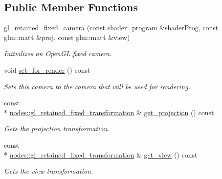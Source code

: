 \subsection*{Public Member Functions}
\begin{DoxyCompactItemize}
\item 
\hyperlink{classoccluded_1_1opengl_1_1retained_1_1scene_1_1objects_1_1gl__retained__fixed__camera_a11d41eb793d0b0ab72d81303f2a0422a}{gl\+\_\+retained\+\_\+fixed\+\_\+camera} (const \hyperlink{classoccluded_1_1opengl_1_1retained_1_1shaders_1_1shader__program}{shader\+\_\+program} \&shader\+Prog, const glm\+::mat4 \&proj, const glm\+::mat4 \&view)
\begin{DoxyCompactList}\small\item\em Initializes an Open\+G\+L fixed camera. \end{DoxyCompactList}\item 
void \hyperlink{classoccluded_1_1opengl_1_1retained_1_1scene_1_1objects_1_1gl__retained__fixed__camera_a81ea1cd723428ac234ca814c43363a90}{set\+\_\+for\+\_\+render} () const 
\begin{DoxyCompactList}\small\item\em Sets this camera to the camera that will be used for rendering. \end{DoxyCompactList}\item 
const \\*
\hyperlink{classoccluded_1_1opengl_1_1retained_1_1scene_1_1nodes_1_1gl__retained__fixed__transformation}{nodes\+::gl\+\_\+retained\+\_\+fixed\+\_\+transformation} \& \hyperlink{classoccluded_1_1opengl_1_1retained_1_1scene_1_1objects_1_1gl__retained__fixed__camera_a167066c59a31c58a34bf8112e3f9ef37}{get\+\_\+projection} () const 
\begin{DoxyCompactList}\small\item\em Gets the projection transformation. \end{DoxyCompactList}\item 
const \\*
\hyperlink{classoccluded_1_1opengl_1_1retained_1_1scene_1_1nodes_1_1gl__retained__fixed__transformation}{nodes\+::gl\+\_\+retained\+\_\+fixed\+\_\+transformation} \& \hyperlink{classoccluded_1_1opengl_1_1retained_1_1scene_1_1objects_1_1gl__retained__fixed__camera_a354c288a4f0c6d05bcbbb256d7c65931}{get\+\_\+view} () const 
\begin{DoxyCompactList}\small\item\em Gets the view transformation. \end{DoxyCompactList}\end{DoxyCompactItemize}
